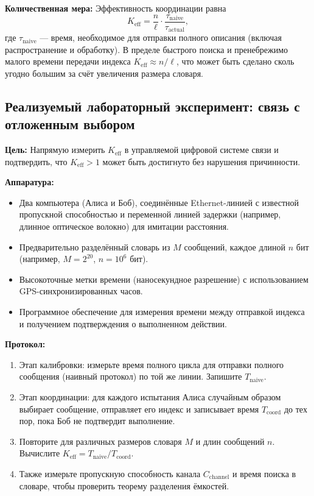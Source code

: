 \documentclass[12pt]{article}
\begin{document}
	\textbf{Количественная мера:}
	Эффективность координации равна
	\[
	K_{\mathrm{eff}} = \frac{n}{\ell} \cdot \frac{\tau_{\text{naive}}}{\tau_{\text{actual}}},
	\]
	где \(\tau_{\text{naive}}\) — время, необходимое для отправки полного описания (включая распространение и обработку). В пределе быстрого поиска и пренебрежимо малого времени передачи индекса \(K_{\mathrm{eff}} \approx n/\ell\), что может быть сделано сколь угодно большим за счёт увеличения размера словаря.
	
	\subsection{Реализуемый лабораторный эксперимент: связь с отложенным выбором}
	\label{subsec:lab-delayed-choice}
	
	\textbf{Цель:} Напрямую измерить \(K_{\mathrm{eff}}\) в управляемой цифровой системе связи и подтвердить, что \(K_{\mathrm{eff}} > 1\) может быть достигнуто без нарушения причинности.
	
	\textbf{Аппаратура:}
	\begin{itemize}
		\item Два компьютера (Алиса и Боб), соединённые Ethernet-линией с известной пропускной способностью и переменной линией задержки (например, длинное оптическое волокно) для имитации расстояния.
		\item Предварительно разделённый словарь из \(M\) сообщений, каждое длиной \(n\) бит (например, \(M = 2^{20}\), \(n = 10^6\) бит).
		\item Высокоточные метки времени (наносекундное разрешение) с использованием GPS-синхронизированных часов.
		\item Программное обеспечение для измерения времени между отправкой индекса и получением подтверждения о выполненном действии.
	\end{itemize}
	
	\textbf{Протокол:}
	\begin{enumerate}
		\item Этап калибровки: измерьте время полного цикла для отправки полного сообщения (наивный протокол) по той же линии. Запишите \(T_{\text{naive}}\).
		\item Этап координации: для каждого испытания Алиса случайным образом выбирает сообщение, отправляет его индекс и записывает время \(T_{\text{coord}}\) до тех пор, пока Боб не подтвердит выполнение.
		\item Повторите для различных размеров словаря \(M\) и длин сообщений \(n\). Вычислите \(K_{\mathrm{eff}} = T_{\text{naive}} / T_{\text{coord}}\).
		\item Также измерьте пропускную способность канала \(C_{\text{channel}}\) и время поиска в словаре, чтобы проверить теорему разделения ёмкостей.
	\end{enumerate}
	
\end{document}
